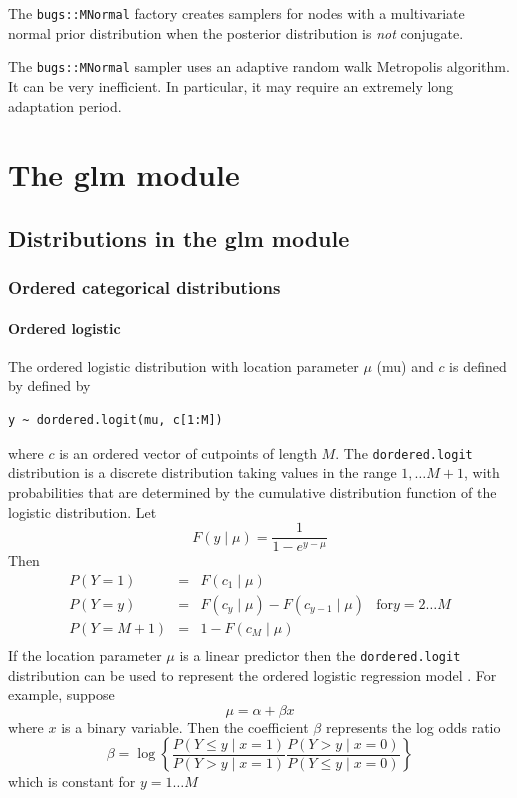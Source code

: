 \documentclass[11pt, a4paper, titlepage]{report}
\begin{document}
The \texttt{bugs::MNormal} factory creates samplers for nodes with a
multivariate normal prior distribution when the posterior distribution
is {\em not} conjugate.

The \texttt{bugs::MNormal} sampler uses an adaptive random walk
Metropolis algorithm. It can be very inefficient. In particular, it
may require an extremely long adaptation period.


\chapter{The glm module}
\label{chapter:glm}

\section{Distributions in the glm module}
\label{section:glm:distributions}

\subsection{Ordered categorical distributions}
\label{glm:dordered.categorical}

\subsubsection{Ordered logistic}

The ordered logistic distribution with location parameter $\mu$ (mu)
and $c$ is defined by
defined by
\begin{verbatim}
y ~ dordered.logit(mu, c[1:M])
\end{verbatim}
where $c$ is an ordered vector of cutpoints of length $M$. The
\texttt{dordered.logit} distribution is a discrete distribution
taking values in the range $1, \ldots M+1$, with probabilities
that are determined by the cumulative distribution function
of the logistic distribution. Let
\[
F(y \mid \mu) = \frac{1}{1 - e^{y-\mu}}
\]
Then
\[
\begin{array}{lcll}
  P(Y = 1) & = & F(c_1 \mid \mu) & \\
  P(Y = y) & = & F(c_{y} \mid \mu) - F(c_{y-1} \mid \mu) & \text{for} y=2 \ldots M \\
  P(Y = M+1) & = & 1 - F(c_M \mid \mu) & \\
\end{array}
\]
If the location parameter $\mu$ is a linear predictor then the
\texttt{dordered.logit} distribution can be used to represent the
ordered logistic regression model \citep{McCullagh1980}. For example,
suppose
\[
\mu = \alpha + \beta x
\]
where $x$ is a binary variable. Then the coefficient $\beta$
represents the log odds ratio
\[
\beta = \log
\left\{
\frac{P\left(Y \leq y \mid x=1\right)}{P\left(Y > y \mid x=1\right)}
\frac{P\left(Y > y \mid x=0\right)}{P\left(Y \leq y \mid x=0\right)}
\right\}
\]
which is constant for $y = 1 \ldots M$
     
\end{document}
